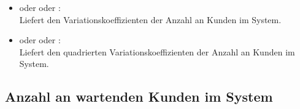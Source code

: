 \begin{itemize}
\item
{} oder  oder :\\
Liefert den Variationskoeffizienten der Anzahl an Kunden im System.

\item
{} oder  oder :\\
Liefert den quadrierten Variationskoeffizienten der Anzahl an Kunden im System.

\end{itemize}



\subsection{Anzahl an wartenden Kunden im System}

